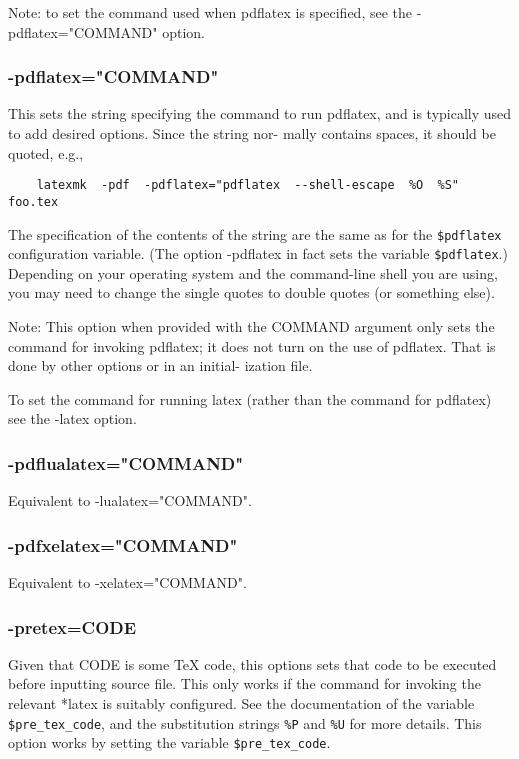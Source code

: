 Note:  to  set  the command used when pdflatex is specified, see
the -pdflatex="COMMAND" option.

\subsubsection{-pdflatex="COMMAND"}

This sets the string specifying the command to run pdflatex, and
is typically used to add desired options.  Since the string nor-
mally contains spaces, it should be quoted, e.g.,

\begin{verbatim}
	latexmk  -pdf  -pdflatex="pdflatex  --shell-escape  %O  %S" foo.tex
\end{verbatim}

The  specification of the contents of the string are the same as for the
\verb|$pdflatex| configuration variable.  (The option -pdflatex in fact sets
the variable \verb|$pdflatex|.)  Depending on your operating system and the
command-line shell you  are  using,  you  may need  to change the single quotes
to double quotes (or something else).

Note: This option when provided with the COMMAND  argument  only
sets  the command for invoking pdflatex; it does not turn on the
use of pdflatex. That is done by other options or in an initial-
ization file.

To  set  the  command for running latex (rather than the command
for pdflatex) see the -latex option.


\subsubsection{-pdflualatex="COMMAND"}

Equivalent to -lualatex="COMMAND".


\subsubsection{-pdfxelatex="COMMAND"}

Equivalent to -xelatex="COMMAND".


\subsubsection{-pretex=CODE}

Given that CODE is some TeX code, this options sets that code to
be  executed  before  inputting source file.  This only works if the command
for invoking the relevant *latex is suitably configured.   See the
documentation of the variable \verb|$pre_tex_code|, and the substitution
strings \verb|%P| and \verb|%U| for more details.   This  option works by
setting the variable \verb|$pre_tex_code|.

